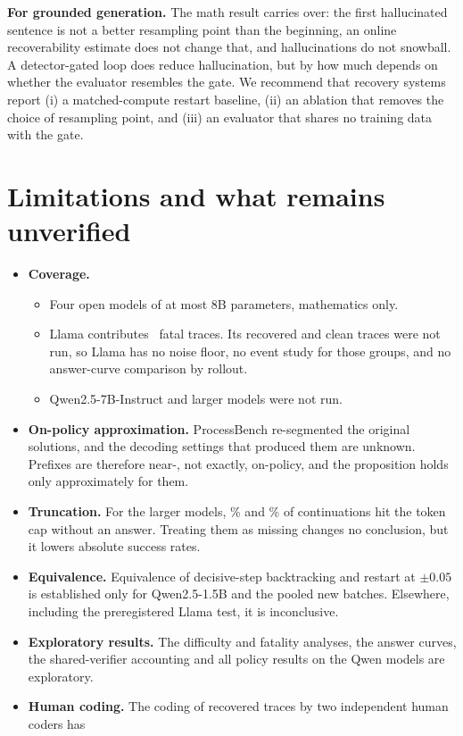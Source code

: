\documentclass[10pt,twocolumn]{article}
\begin{document}
\textbf{For grounded generation.} The math result carries over: the first hallucinated sentence is
not a better resampling point than the beginning, an online recoverability estimate does not
change that, and hallucinations do not snowball. A detector-gated loop does reduce hallucination,
but by how much depends on whether the evaluator resembles the gate. We recommend that recovery
systems report (i) a matched-compute restart baseline, (ii) an ablation that removes the choice of
resampling point, and (iii) an evaluator that shares no training data with the gate.

\section{Limitations and what remains unverified}\label{sec:limits}
\begin{itemize}
\item \textbf{Coverage.}
  \begin{itemize}
  \item Four open models of at most 8B parameters, mathematics only.
  \item Llama contributes \LlamaN\ fatal traces. Its recovered and clean traces were not run, so
  Llama has no noise floor, no event study for those groups, and no answer-curve comparison by
  rollout.
  \item Qwen2.5-7B-Instruct and larger models were not run.
  \end{itemize}
\item \textbf{On-policy approximation.} ProcessBench re-segmented the original solutions, and the
decoding settings that produced them are unknown. Prefixes are therefore near-, not exactly,
on-policy, and the proposition holds only approximately for them.
\item \textbf{Truncation.} For the larger models, \QwenMathTruncPct\% and \LlamaTruncPct\% of
continuations hit the token cap without an answer. Treating them as missing changes no
conclusion, but it lowers absolute success rates.
\item \textbf{Equivalence.} Equivalence of decisive-step backtracking and restart at $\pm0.05$ is
established only for Qwen2.5-1.5B and the pooled new batches. Elsewhere, including the
preregistered Llama test, it is inconclusive.
\item \textbf{Exploratory results.} The difficulty and fatality analyses, the answer curves, the
shared-verifier accounting and all policy results on the Qwen models are exploratory.
\item \textbf{Human coding.} The coding of recovered traces by two independent human coders has

\end{itemize}
\end{document}
